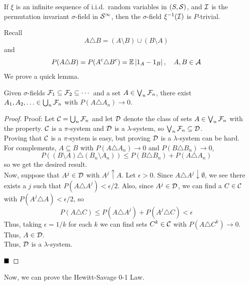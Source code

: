 
\begin{theorem}
    If $\xi$ is an infinite sequence of i.i.d.\ random variables in $(S, \cal{S})$, and $\cal{I}$ is the permutation invariant $\sigma$-field in $\cal{S}^{\infty}$, then the $\sigma$-field $\xi^{-1}(\cal{I})$ is $P$-trivial.
\end{theorem}

Recall
\[ A \triangle B = (A \setminus B) \cup (B \setminus A) \]
and
\[ P(A \triangle B) = P(A^{c} \triangle B^{c}) = \mathbb{E}\abs{1_A - 1_B}, \quad A, B \in \cal{A} \]
We prove a quick lemma.

\begin{lemma}
    Given $\sigma$-fields $\cal{F}_1 \subseteq \cal{F}_2 \subseteq \cdots$ and a set $A \in \bigvee_{n} \cal{F}_n$, there exist $A_1, A_2, \ldots \in \bigcup_{n} \cal{F}_n$ with $P(A \triangle A_n) \to 0$.
\end{lemma}
\begin{proof}{Proof:}
    Let $\cal{C} = \bigcup_{n} \cal{F}_n$ and let $\cal{D}$ denote the class of sets $A \in \bigvee_{n} \cal{F}_n$ with the property. $\cal{C}$ is a $\pi$-system and $\cal{D}$ is a $\lambda$-system, so $\bigvee_{n} \cal{F}_n \subseteq \cal{D}$.\\

    
    Proving that $\cal{C}$ is a $\pi$-system is easy, but proving $\cal{D}$ is a $\lambda$-system can be hard. For complements, $A \subseteq B$ with $P(A \triangle A_n) \to 0$ and $P(B \triangle B_n) \to 0$,
    \[ P((B \setminus A) \triangle (B_n \setminus A_n)) \leq P(B \triangle B_n) + P(A \triangle A_n) \]
    so we get the desired result.\\

   
    Now, suppose that $A^{j} \in \cal{D}$ with $A^{j} \uparrow A$. Let $\epsilon > 0$. Since $A \triangle A^{j} \downarrow \emptyset$, we see there exists a $j$ such that $P(A \triangle A^{j}) < \epsilon/2$. Also, since $A^{j} \in \cal{D}$, we can find a $C \in \cal{C}$ with $P(A^{j} \triangle A) < \epsilon /2$, so
    \[ P(A \triangle C) \leq P(A \triangle A^{j}) + P(A^{j} \triangle C) < \epsilon \]
    Thus, taking $\epsilon = 1/k$ for each $k$ we can find sets $C^{k} \in \cal{C}$ with $P(A \triangle C^{k}) \to 0$. Thus, $A \in \cal{D}$.\\

    Thus, $\cal{D}$ is a $\lambda$-system.

    $\qed$
\end{proof}
Now, we can prove the Hewitt-Savage 0-1 Law.
\vspace{0.6cm}

